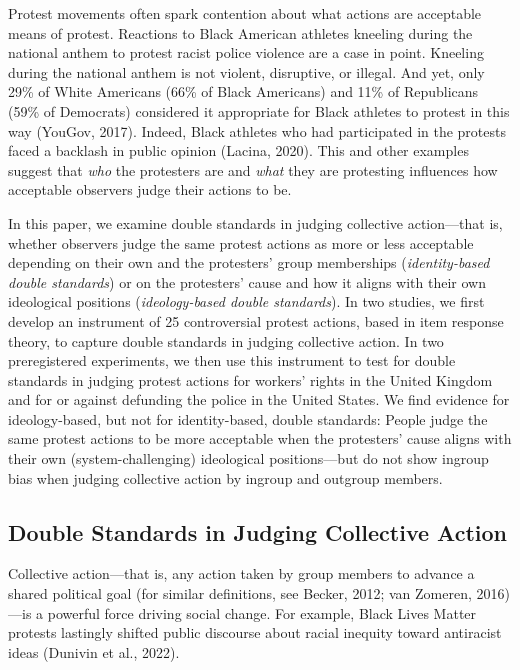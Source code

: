 \documentclass[twocolumn, 11pt, letterpaper]{article}
\begin{document}
\noindent Protest movements often spark contention about what actions
are acceptable means of protest. Reactions to Black American athletes
kneeling during the national anthem to protest racist police violence
are a case in point. Kneeling during the national anthem is not violent,
disruptive, or illegal. And yet, only 29\% of White Americans (66\% of
Black Americans) and 11\% of Republicans (59\% of Democrats) considered
it appropriate for Black athletes to protest in this way (YouGov, 2017).
Indeed, Black athletes who had participated in the protests faced a
backlash in public opinion (Lacina, 2020). This and other examples
suggest that \emph{who} the protesters are and \emph{what} they are
protesting influences how acceptable observers judge their actions to
be.

In this paper, we examine double standards in judging collective
action---that is, whether observers judge the same protest actions as
more or less acceptable depending on their own and the protesters' group
memberships (\emph{identity-based double standards}) or on the
protesters' cause and how it aligns with their own ideological positions
(\emph{ideology-based double standards}). In two studies, we first
develop an instrument of 25 controversial protest actions, based in item
response theory, to capture double standards in judging collective
action. In two preregistered experiments, we then use this instrument to
test for double standards in judging protest actions for workers' rights
in the United Kingdom and for or against defunding the police in the
United States. We find evidence for ideology-based, but not for
identity-based, double standards: People judge the same protest actions
to be more acceptable when the protesters' cause aligns with their own
(system-challenging) ideological positions---but do not show ingroup
bias when judging collective action by ingroup and outgroup members.

\hypertarget{double-standards-in-judging-collective-action}{%
\subsection{Double Standards in Judging Collective
Action}\label{double-standards-in-judging-collective-action}}

Collective action---that is, any action taken by group members to
advance a shared political goal (for similar definitions, see Becker,
2012; van Zomeren, 2016)---is a powerful force driving social change.
For example, Black Lives Matter protests lastingly shifted public
discourse about racial inequity toward antiracist ideas (Dunivin et al.,
2022).
\end{document}
